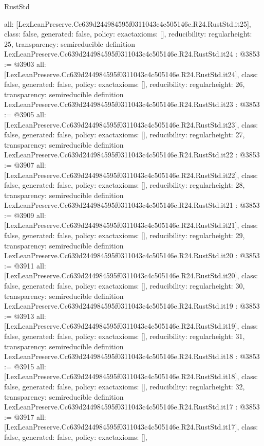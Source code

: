 \begin{lexlean}{RustStd}
\begin{coremodule}
{  all: [LexLeanPreserve.Cc639d244984595f0311043c4c505146e.R24.RustStd.it25],
  class: false,
  generated: false,
  policy: exact{axioms: []},
  reducibility: regular{height: 25},
  transparency: semireducible
}
definition LexLeanPreserve.Cc639d244984595f0311043c4c505146e.R24.RustStd.it24 : @3853 := @3903 {
  all: [LexLeanPreserve.Cc639d244984595f0311043c4c505146e.R24.RustStd.it24],
  class: false,
  generated: false,
  policy: exact{axioms: []},
  reducibility: regular{height: 26},
  transparency: semireducible
}
definition LexLeanPreserve.Cc639d244984595f0311043c4c505146e.R24.RustStd.it23 : @3853 := @3905 {
  all: [LexLeanPreserve.Cc639d244984595f0311043c4c505146e.R24.RustStd.it23],
  class: false,
  generated: false,
  policy: exact{axioms: []},
  reducibility: regular{height: 27},
  transparency: semireducible
}
definition LexLeanPreserve.Cc639d244984595f0311043c4c505146e.R24.RustStd.it22 : @3853 := @3907 {
  all: [LexLeanPreserve.Cc639d244984595f0311043c4c505146e.R24.RustStd.it22],
  class: false,
  generated: false,
  policy: exact{axioms: []},
  reducibility: regular{height: 28},
  transparency: semireducible
}
definition LexLeanPreserve.Cc639d244984595f0311043c4c505146e.R24.RustStd.it21 : @3853 := @3909 {
  all: [LexLeanPreserve.Cc639d244984595f0311043c4c505146e.R24.RustStd.it21],
  class: false,
  generated: false,
  policy: exact{axioms: []},
  reducibility: regular{height: 29},
  transparency: semireducible
}
definition LexLeanPreserve.Cc639d244984595f0311043c4c505146e.R24.RustStd.it20 : @3853 := @3911 {
  all: [LexLeanPreserve.Cc639d244984595f0311043c4c505146e.R24.RustStd.it20],
  class: false,
  generated: false,
  policy: exact{axioms: []},
  reducibility: regular{height: 30},
  transparency: semireducible
}
definition LexLeanPreserve.Cc639d244984595f0311043c4c505146e.R24.RustStd.it19 : @3853 := @3913 {
  all: [LexLeanPreserve.Cc639d244984595f0311043c4c505146e.R24.RustStd.it19],
  class: false,
  generated: false,
  policy: exact{axioms: []},
  reducibility: regular{height: 31},
  transparency: semireducible
}
definition LexLeanPreserve.Cc639d244984595f0311043c4c505146e.R24.RustStd.it18 : @3853 := @3915 {
  all: [LexLeanPreserve.Cc639d244984595f0311043c4c505146e.R24.RustStd.it18],
  class: false,
  generated: false,
  policy: exact{axioms: []},
  reducibility: regular{height: 32},
  transparency: semireducible
}
definition LexLeanPreserve.Cc639d244984595f0311043c4c505146e.R24.RustStd.it17 : @3853 := @3917 {
  all: [LexLeanPreserve.Cc639d244984595f0311043c4c505146e.R24.RustStd.it17],
  class: false,
  generated: false,
  policy: exact{axioms: []},
}
\end{coremodule}
\end{lexlean}
